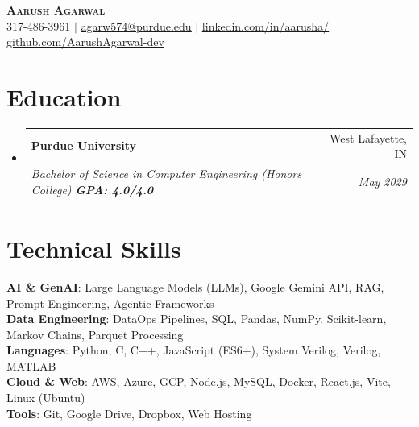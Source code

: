 \documentclass[letterpaper,11pt]{article}
\makeatletter
\newcommand{\resumeSubheading}[4]{
  \vspace{-2pt}\item
    \begin{tabular*}{0.97\textwidth}[t]{l@{\extracolsep{\fill}}r}
      \textbf{#1} & #2 \\
      \textit{\small#3} & \textit{\small #4} \\
    \end{tabular*}\vspace{-7pt}
}
\newcommand{\resumeSubHeadingListStart}{\begin{itemize}[leftmargin=0.15in, label={}]}
\newcommand{\resumeSubHeadingListEnd}{\end{itemize}}
\makeatother
\begin{document}
\begin{center}
    \textbf{\Huge \scshape Aarush Agarwal} \\ \vspace{1pt}
    \small 317-486-3961 $|$ \href{mailto:agarw574@purdue.edu}{\underline{agarw574@purdue.edu}} $|$ 
    \href{https://www.linkedin.com/in/aarusha/}{\underline{linkedin.com/in/aarusha/}} $|$
    \href{https://github.com/AarushAgarwal-dev}{\underline{github.com/AarushAgarwal-dev}}
\end{center}

\section{Education}
  \resumeSubHeadingListStart
    \resumeSubheading
      {Purdue University}{West Lafayette, IN}
      {Bachelor of Science in Computer Engineering (Honors College)\textbf{ GPA: 4.0/4.0}}{May 2029}
  \resumeSubHeadingListEnd

\section{Technical Skills}
 \begin{itemize}[leftmargin=0.15in, label={}]
    \small{\item{
     \textbf{AI \& GenAI}{: Large Language Models (LLMs), Google Gemini API, RAG, Prompt Engineering, Agentic Frameworks} \\
     \textbf{Data Engineering}{: DataOps Pipelines, SQL, Pandas, NumPy, Scikit-learn, Markov Chains, Parquet Processing} \\
     \textbf{Languages}{: Python, C, C++, JavaScript (ES6+), System Verilog, Verilog, MATLAB} \\
     \textbf{Cloud \& Web}{: AWS, Azure, GCP, Node.js, MySQL, Docker, React.js, Vite, Linux (Ubuntu)} \\
     \textbf{Tools}{: Git, Google Drive, Dropbox, Web Hosting} 
    }}
 \end{itemize}
\end{document}
